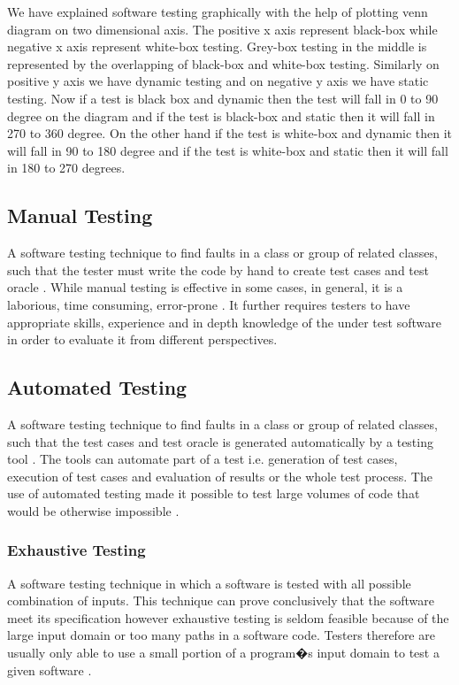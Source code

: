 We have explained software testing graphically with the help of plotting venn diagram on two dimensional axis. The positive x axis represent black-box while negative x axis represent white-box testing. Grey-box testing in the middle is represented by the overlapping of black-box and white-box testing. Similarly on positive y axis we have dynamic testing and on negative y axis we have static testing.
Now if a test is black box and dynamic then the test will fall in 0 to 90 degree on the diagram and if the test is black-box and static then it will fall in 270 to 360 degree. On the other hand if the test is white-box and dynamic then it will fall in 90 to 180 degree and if the test is white-box and static then it will fall in 180 to 270 degrees.

\subsection{Manual Testing}
 A software testing technique to find faults in a class or group of related classes, such that the tester must write the code by hand to create test cases and test oracle \cite{Ciupa2008}. While manual testing is effective in some cases, in general, it is a laborious, time consuming, error-prone \cite{tretmans1999}. It further requires testers to have appropriate skills, experience and in depth knowledge of the under test software in order to evaluate it from different perspectives.
 
\subsection{Automated Testing}
A software testing technique to find faults in a class or group of related classes, such that the test cases and test oracle is generated automatically by a testing tool \cite{Leitner2007}. The tools can automate part of a test i.e. generation of test cases, execution of test cases and evaluation of results or the whole test process. The use of automated testing made it possible to test large volumes of code that would be otherwise impossible \cite{ramamoorthy1975}.

\subsubsection{Exhaustive Testing}
A software testing technique in which a software is tested with all possible combination of inputs. This technique can prove conclusively that the software meet its specification however exhaustive testing is seldom feasible because of the large input domain or too many paths in a software code. Testers therefore are usually only able to use a small portion of a program�s input domain to test a given software \cite{chan2003normalized}.


